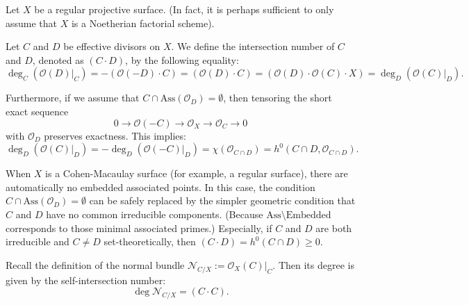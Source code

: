 
\begin{remark}
    Let $X$ be a regular projective surface. (In fact, it is perhaps sufficient to only assume that $X$ is a Noetherian factorial scheme).
\end{remark}

\begin{definition}[Notations]
Let $C$ and $D$ be effective divisors on $X$. We define the intersection number of $C$ and $D$, denoted as $(C \cdot D)$, by the following equality:
\[
\deg_C(\mathcal{O}(D)|_C) = -(\mathcal{O}(-D) \cdot C) = (\mathcal{O}(D) \cdot C) = (\mathcal{O}(D) \cdot \mathcal{O}(C) \cdot X) = \deg_D(\mathcal{O}(C)|_D).
\]
\end{definition}

Furthermore, if we assume that $C \cap \text{Ass}(\mathcal{O}_D) = \emptyset$, then tensoring the short exact sequence
\[
0 \longrightarrow \mathcal{O}(-C) \longrightarrow \mathcal{O}_X \longrightarrow \mathcal{O}_C \longrightarrow 0
\]
with $\mathcal{O}_D$ preserves exactness. This implies:
\[
\deg_D(\mathcal{O}(C)|_D) = -\deg_D(\mathcal{O}(-C)|_D) = \chi(\mathcal{O}_{C \cap D}) = h^0(C \cap D, \mathcal{O}_{C \cap D}).
\]

\begin{remark}[20.2.1]
When $X$ is a Cohen-Macaulay surface (for example, a regular surface), there are automatically no embedded associated points. In this case, the condition $C \cap \mathrm{Ass}(\mathcal{O}_D) = \emptyset$ can be safely replaced by the simpler geometric condition that $C$ and $D$ have no common irreducible components.
(Because $\mathrm{Ass}\setminus \mathrm{Embedded} $ corresponds to those minimal associated primes.)
Especially, if $C$ and $D$ are both irreducible and $C \neq D$ set-theoretically, then $(C \cdot D)=h^0(C\cap D)\geq 0$.
\end{remark}

\begin{remark}[20.2.3]
Recall the definition of the normal bundle $\mathcal{N}_{C/X} := \mathcal{O}_X(C)|_C$. Then its degree is given by the self-intersection number: 
\[
\deg \mathcal{N}_{C/X} = (C \cdot C).
\]
\end{remark}

